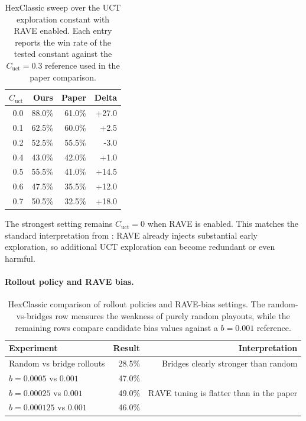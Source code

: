 \documentclass[11pt,a4paper]{article}
\begin{document}
\begin{table}[t]
\centering
\begin{tabular}{@{}rrrr@{}}
\toprule
$C_{\mathrm{uct}}$ & Ours & Paper & Delta \\
\midrule
0.0 & 88.0\% & 61.0\% & +27.0 \\
0.1 & 62.5\% & 60.0\% & +2.5  \\
0.2 & 52.5\% & 55.5\% & -3.0  \\
0.4 & 43.0\% & 42.0\% & +1.0  \\
0.5 & 55.5\% & 41.0\% & +14.5 \\
0.6 & 47.5\% & 35.5\% & +12.0 \\
0.7 & 50.5\% & 32.5\% & +18.0 \\
\bottomrule
\end{tabular}
\caption{HexClassic sweep over the UCT exploration constant with RAVE enabled.
Each entry reports the win rate of the tested constant against the
$C_{\mathrm{uct}}=0.3$ reference used in the paper comparison.}
\label{tab:hexclassic-uct}
\end{table}

The strongest setting remains $C_{\mathrm{uct}}=0$ when RAVE is enabled. This
matches the standard interpretation from \cite{cazenave2010montecarlohex}:
RAVE already injects substantial early exploration, so additional UCT
exploration can become redundant or even harmful.

\paragraph{Rollout policy and RAVE bias.}

\begin{table}[t]
\centering
\begin{tabular}{@{}lrr@{}}
\toprule
Experiment & Result & Interpretation \\
\midrule
Random vs bridge rollouts & 28.5\% & Bridges clearly stronger than random \\
$b = 0.0005$ vs $0.001$ & 47.0\% & \\
$b = 0.00025$ vs $0.001$ & 49.0\% & RAVE tuning is flatter than in the paper \\
$b = 0.000125$ vs $0.001$ & 46.0\% & \\
\bottomrule
\end{tabular}
\caption{HexClassic comparison of rollout policies and RAVE-bias settings. The
random-vs-bridges row measures the weakness of purely random playouts, while
the remaining rows compare candidate bias values against a $b=0.001$ reference.}
\label{tab:hexclassic-rollout-rave}
\end{table}
\end{document}
